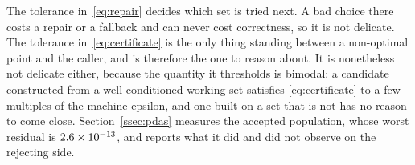 \begin{remark}
The tolerance in~\eqref{eq:repair} decides which set is tried next. A bad choice
there costs a repair or a fallback and can never cost correctness, so it is not
delicate. The tolerance in~\eqref{eq:certificate} is the only thing standing
between a non-optimal point and the caller, and is therefore the one to reason
about. It is nonetheless not delicate either, because the quantity it thresholds
is bimodal: a candidate constructed from a well-conditioned working set satisfies
\eqref{eq:certificate} to a few multiples of the machine epsilon, and one built on
a set that is not has no reason to come close. Section~\ref{ssec:pdas} measures
the accepted population, whose worst residual is $2.6\times 10^{-13}$, and reports
what it did and did not observe on the rejecting side.
\end{remark}

